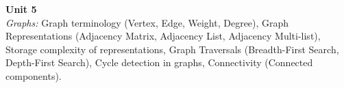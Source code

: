 \vspace{0.3cm}

\noindent\textbf{Unit 5} \\
\textit{Graphs:} Graph terminology (Vertex, Edge, Weight, Degree), Graph Representations (Adjacency Matrix, Adjacency List, Adjacency Multi-list), Storage complexity of representations, Graph Traversals (Breadth-First Search, Depth-First Search), Cycle detection in graphs, Connectivity (Connected components).

\newpage
{}